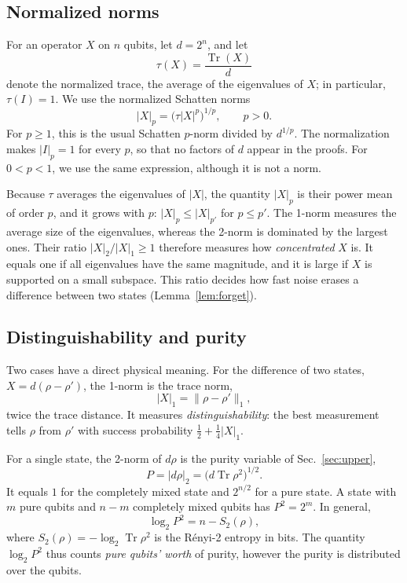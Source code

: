 \documentclass[aps,pra,reprint,superscriptaddress,floatfix]{revtex4-2}
\theoremstyle{plain}
\newcommand{\tr}{\operatorname{Tr}}
\newcommand{\nrm}[2]{\lvert #1\rvert_{#2}}
\newcommand{\Norm}[1]{\lVert #1\rVert}
\begin{document}
\subsection{Normalized norms}

For an operator $X$ on $n$ qubits, let $d=2^n$, and let
\begin{equation}
\tau(X)=\frac{\tr(X)}d
\end{equation}
denote the normalized trace, the average of the eigenvalues of $X$; in particular, $\tau(I)=1$. We use the normalized Schatten norms
\begin{equation}
\nrm Xp=\bigl(\tau|X|^p\bigr)^{1/p},\qquad p>0 .
\label{eq:N-norm}
\end{equation}
For $p\ge1$, this is the usual Schatten $p$-norm divided by $d^{1/p}$. The normalization makes $\nrm Ip=1$ for every $p$, so that no factors of $d$ appear in the proofs. For $0<p<1$, we use the same expression, although it is not a norm.

Because $\tau$ averages the eigenvalues of $|X|$, the quantity $\nrm Xp$ is their power mean of order $p$, and it grows with $p$: $\nrm Xp\le\nrm X{p'}$ for $p\le p'$. The 1-norm measures the average size of the eigenvalues, whereas the 2-norm is dominated by the largest ones. Their ratio $\nrm X2/\nrm X1\ge1$ therefore measures how \emph{concentrated} $X$ is. It equals one if all eigenvalues have the same magnitude, and it is large if $X$ is supported on a small subspace. This ratio decides how fast noise erases a difference between two states (Lemma~\ref{lem:forget}).

\subsection{Distinguishability and purity}

Two cases have a direct physical meaning. For the difference of two states, $X=d(\rho-\rho')$, the 1-norm is the trace norm,
\begin{equation}
\nrm X1=\Norm{\rho-\rho'}_1 ,
\end{equation}
twice the trace distance. It measures \emph{distinguishability}: the best measurement tells $\rho$ from $\rho'$ with success probability $\frac12+\frac14\nrm X1$.

For a single state, the 2-norm of $d\rho$ is the purity variable of Sec.~\ref{sec:upper},
\begin{equation}
P=\nrm{d\rho}2=\bigl(d\tr\rho^2\bigr)^{1/2}.
\label{eq:N-purity}
\end{equation}
It equals $1$ for the completely mixed state and $2^{n/2}$ for a pure state. A state with $m$ pure qubits and $n-m$ completely mixed qubits has $P^2=2^m$. In general,
\begin{equation}
\log_2P^2=n-S_2(\rho),
\end{equation}
where $S_2(\rho)=-\log_2\tr\rho^2$ is the R\'enyi-2 entropy in bits. The quantity $\log_2P^2$ thus counts \emph{pure qubits' worth} of purity, however the purity is distributed over the qubits.
\end{document}
